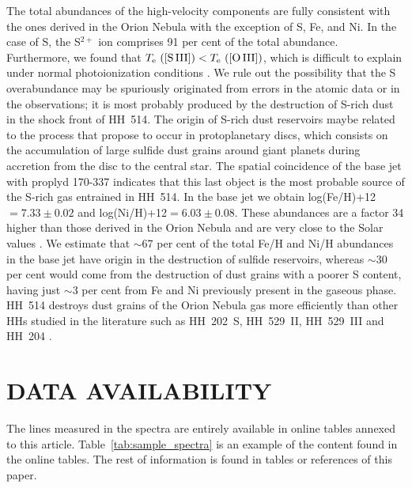 \documentclass[fleqn,usenatbib]{mnras}
\newcommand{\jorge}[1]{{\color{magenta}J: #1}}
\begin{document}
The total abundances of the high-velocity components are fully consistent with the ones derived in the Orion Nebula with the exception of S, Fe, and Ni. In the case of S, the S$^{2+}$ ion comprises 91 per cent of the total abundance. Furthermore, we found that $T_{\rm e} \text{ ([S\thinspace III])} < T_{\rm e} \text{ ([O\thinspace III])} $, which is difficult to explain under normal photoionization conditions \citep[][]{Binette2012}. We rule out the possibility that the S overabundance may be spuriously originated from errors in the atomic data or in the observations;  it is most probably produced by the destruction of S-rich dust in the shock front of HH~514. The origin of  S-rich dust reservoirs maybe related to the process that \citet{Kama19} propose to occur in protoplanetary discs, which consists on the accumulation of large sulfide dust grains around giant planets during  accretion from the disc to the central star. The spatial coincidence of the base jet with proplyd 170-337 indicates that this last object is the most probable source of the S-rich gas entrained in HH~514. In the base jet we obtain log(Fe/H)+12$ =  7.33 \pm 0.02$ and log(Ni/H)+12$ = 6.03 \pm 0.08$. These abundances are a factor 34 higher than those derived in the Orion Nebula and are very close to the Solar values \citep[][]{lodders19}. We estimate that $\sim$67 per cent of the total Fe/H and Ni/H abundances in the base jet have origin in the destruction of sulfide reservoirs, whereas $\sim$30 per cent would come from the destruction of dust grains with a poorer S content, having just $\sim$3 per cent from Fe and Ni previously present in the gaseous phase. HH~514 destroys dust grains of the Orion Nebula gas more efficiently than other HHs studied in the literature such as HH~202~S, HH~529~II, HH~529~III and HH~204 \citep[][]{mesadelgado09, mendez2021, mendez2021-2}. %




\section*{DATA AVAILABILITY}
The lines measured in the spectra are entirely available in online tables annexed to this article. Table~\ref{tab:sample_spectra} is an example of the content found in the online tables. The rest of information is found in tables or references of this paper.
\end{document}
